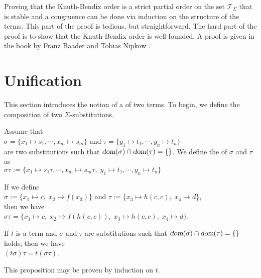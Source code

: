 Proving that the Knuth-Bendix order is a strict partial order on the set $\mathcal{T}_\Sigma$ that is stable
and a congruence can be done via induction on the structure of the terms.  This part of the proof is tedious,
but straightforward.  The hard part of the proof is to
show that the Knuth-Bendix order is well-founded.  A proof is given in the book by Franz Baader and Tobias
Nipkow \cite{baader:1998}.

\section{Unification}
This section introduces the notion of a  of two terms.
To begin, we define the composition of two $\Sigma$-substitutions.

\begin{Definition} 
    Assume that \\[0.2cm]
    \hspace*{1.3cm}
    $\sigma = \{ x_1 \mapsto s_1, \cdots, x_m \mapsto s_m \}$
    \quad and \quad
    $\tau = \{ y_1 \mapsto t_1, \cdots, y_n \mapsto t_n \}$
    \\[0.2cm]
    are two substitutions such that $\textsl{dom}(\sigma) \cap \textsl{dom}(\tau) = \{\}$.
    We define the    of $\sigma$ and $\tau$  as
    \\[0.2cm]
    \hspace*{1.3cm}
    $\sigma\tau := \{ x_1 \mapsto s_1\tau, \cdots, x_m \mapsto s_m\tau,\; y_1 \mapsto t_1, \cdots, y_n \mapsto t_n \}$
    \eoxs
\end{Definition}

\example
If we define
\\[0.2cm]
\hspace*{1.3cm}
$\sigma := \{ x_1 \mapsto c,\; x_2 \mapsto f(x_3) \}$ \quad and \quad
$\tau := \{ x_3 \mapsto h(c,c),\; x_4 \mapsto d \}$,
\\[0.2cm]
then we have
\\[0.2cm]
\hspace*{1.3cm}
$\sigma\tau = \{ x_1 \mapsto c,\; x_2 \mapsto f(h(c,c)),\; x_3 \mapsto h(c,c),\;x_4 \mapsto d \}$.
\eoxs
\vspace{0.3cm}

\begin{Proposition} \label{satz:composition}
    If $t$ is a term and $\sigma$ and $\tau$ are substitutions such that  
    $\textsl{dom}(\sigma) \cap \textsl{dom}(\tau) = \{\}$ holds, then we have
    \\[0.2cm]
    \hspace*{1.3cm} $(t \sigma)\tau = t (\sigma\tau)$.
    \eoxs
\end{Proposition}
This proposition may be proven by induction on $t$.

